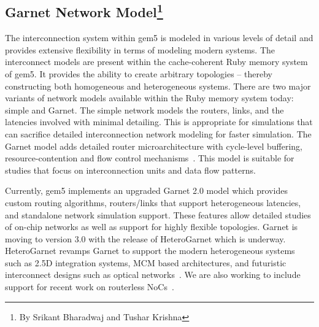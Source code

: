 \subsection[Garnet Network Model]{Garnet Network Model\footnote{By Srikant Bharadwaj and Tushar Krishna}}
\label{sec:garnet}

The interconnection system within gem5 is modeled in various levels of detail and provides extensive
flexibility in terms of modeling modern systems.
The interconnect models are present within the cache-coherent Ruby memory system of gem5.
It provides the ability to create arbitrary topologies -- thereby constructing both homogeneous and heterogeneous systems.
There are two major variants of network models available within the Ruby memory system today: simple and Garnet.
The simple network models the routers, links, and the latencies involved with minimal detailing.
This is appropriate for simulations that can sacrifice detailed interconnection network modeling for faster simulation.
The Garnet model adds detailed router microarchitecture with cycle-level buffering, resource-contention and flow control mechanisms~\cite{garnet-2}.
This model is suitable for studies that focus on interconnection units and data flow patterns.

Currently, gem5 implements an upgraded Garnet 2.0 model which provides custom routing algorithms, routers/links that support heterogeneous latencies, and standalone network simulation support.
These features allow detailed studies of on-chip networks as well as support for highly flexible topologies.
Garnet is moving to version 3.0 with the release of HeteroGarnet which is underway.
HeteroGarnet revamps Garnet to support the modern heterogeneous systems such as 2.5D integration systems, MCM based architectures, and futuristic interconnect designs such as optical networks~\cite{kite}.
We are also working to include support for recent work on routerless NoCs~\cite{AlazemiABC18, LinPPC20}.

